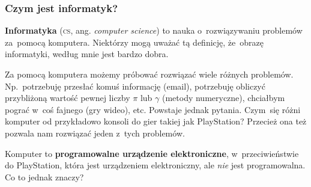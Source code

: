 \documentclass[10pt,t]{beamer}
\begin{document}
\begin{frame}
  \frametitle{Czym jest informatyk?}


  \textbf{Informatyka} (\textsc{cs}, ang. \textit{computer science}) to
  nauka o~rozwiązywaniu problemów za~pomocą komputera. Niektórzy mogą
  uważać tą definicję, że~obrazę informatyki, według mnie jest bardzo dobra.

  Za pomocą komputera możemy próbować rozwiązać wiele różnych problemów.
  Np.~potrzebuję przesłać komuś informację (email), potrzebuję obliczyć
  przybliżoną wartość pewnej liczby $\pi$ lub $\gamma$ (metody numeryczne),
  chciałbym pograć w~coś fajnego (gry wideo), etc. Powstaje jednak pytania.
  Czym~się różni komputer od przykładowo konsoli do gier takiej jak
  PlayStation? Przecież ona też pozwala nam rozwiązać jeden z~tych
  problemów.

  Komputer to \textbf{programowalne urządzenie elektroniczne},
  w~przeciwieństwie do PlayStation, która jest urządzeniem elektroniczny,
  ale \textit{nie} jest programowalna. Co to jednak znaczy?

\end{frame}









\end{document}
